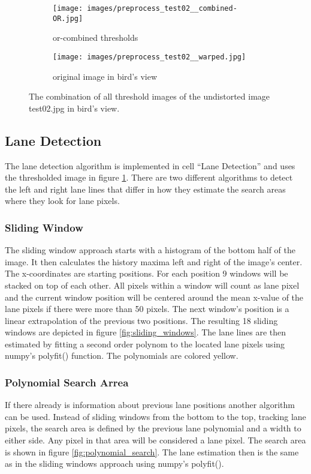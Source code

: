 \documentclass[a4paper, 11pt, DIV=14]{scrartcl}
\begin{document}
\begin{figure}[h]
    \centering
    \begin{subfigure}{0.45\textwidth}
        \texttt{[image: images/preprocess\_test02\_\_combined-OR.jpg]}
	\caption{or-combined thresholds}
	\label{fig:threshold_combined}
    \end{subfigure}\quad
    \begin{subfigure}{0.45\textwidth}
        \texttt{[image: images/preprocess\_test02\_\_warped.jpg]}
    \caption{original image in bird's view}
    \end{subfigure} 
    \caption{The combination of all threshold images of the undistorted image test02.jpg in bird's view.}
    \label{fig:threshold_final}
\end{figure}

\subsection{Lane Detection}
The lane detection algorithm is implemented in cell ``Lane Detection'' and uses the thresholded image in figure \ref{fig:threshold_combined}. There are two different algorithms to detect the left and right lane lines that differ in how they estimate the search areas where they look for lane pixels.

\subsubsection*{Sliding Window}
The sliding window approach starts with a histogram of the bottom half of the image. It then calculates the history maxima left and right of the image's center. The x-coordinates are starting positions. For each position 9 windows will be stacked on top of each other. All pixels within a window will count as lane pixel and the current window position will be centered around the mean x-value of the lane pixels if there were more than 50 pixels. The next window's position is a linear extrapolation of the previous two positions. The resulting 18 sliding windows are depicted in figure \ref{fig:sliding_windows}. The lane lines are then estimated by fitting a second order polynom to the located lane pixels using numpy's polyfit() function. The polynomials are colored yellow.

\subsubsection*{Polynomial Search Arrea}
If there already is information about previous lane positions another algorithm can be used. Instead of sliding windows from the bottom to the top, tracking lane pixels, the search area is defined by the previous lane polynomial and a width to either side. Any pixel in that area will be considered a lane pixel. The search area is shown in figure \ref{fig:polynomial_search}. The lane estimation then is the same as in the sliding windows approach using numpy's polyfit().
\end{document}
